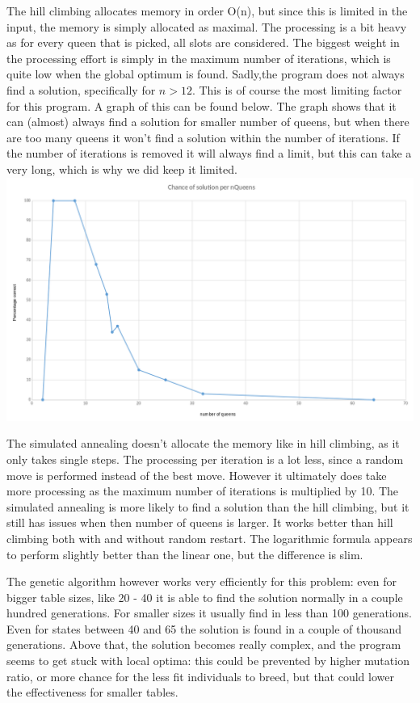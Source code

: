 \documentclass{article}
\begin{document}
The hill climbing allocates memory in order O(n), but since this is limited in the input, the memory is simply allocated as maximal. The processing is a bit heavy as for every queen that is picked, all slots are considered. The biggest weight in the processing effort is simply in the maximum number of iterations, which is quite low when the global optimum is found. Sadly,the program does not always find a solution, specifically for $n>12$. This is of course the most limiting factor for this program. A graph of this can be found below. The graph shows that it can (almost) always find a solution for smaller number of queens, but when there are too many queens it won't find a solution within the number of iterations. If the number of iterations is removed it will always find a limit, but this can take a very long, which is why we did keep it limited.
\includegraphics[scale=0.2]{./HillClimbGraph.png}

The simulated annealing doesn't allocate the memory like in hill climbing, as it only takes single steps. The processing per iteration is a lot less, since a random move is performed instead of the best move. However it ultimately does take more processing as the maximum number of iterations is multiplied by 10. The simulated annealing is more likely to find a solution than the hill climbing, but it still has issues when then number of queens is larger. It works better than hill climbing both with and without random restart. The logarithmic formula appears to perform slightly better than the linear one, but the difference is slim. 

The genetic algorithm however works very efficiently for this problem: even for bigger table sizes, like 20 - 40 it is able to find the solution normally in a couple hundred generations. For smaller sizes it usually find in less than 100 generations. Even for states between 40 and 65 the solution is found in a couple of thousand generations. Above that, the solution becomes really complex, and the program seems to get stuck with local optima: this could be prevented by higher mutation ratio, or more chance for the less fit individuals to breed, but that could lower the effectiveness for smaller tables. 
\end{document}
